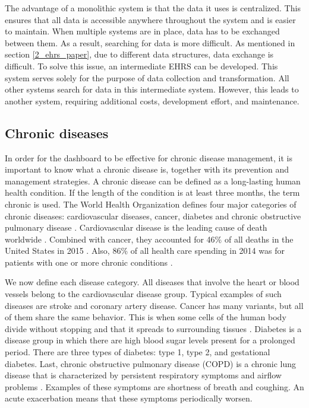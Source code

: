         The advantage of a monolithic system is that the data it uses is centralized. This ensures that all data is accessible anywhere throughout the system and is easier to maintain. When multiple systems are in place, data has to be exchanged between them. As a result, searching for data is more difficult. As mentioned in section \ref{2_ehrs_paper}, due to different data structures, data exchange is difficult. To solve this issue, an intermediate EHRS can be developed. This system serves solely for the purpose of data collection and transformation. All other systems search for data in this intermediate system. However, this leads to another system, requiring additional costs, development effort, and maintenance.
    
    \subsection{Chronic diseases} \label{chronic_diseases}

    In order for the dashboard to be effective for chronic disease management, it is important to know what a chronic disease is, together with its prevention and management strategies. A chronic disease can be defined as a long-lasting human health condition. If the length of the condition is at least three months, the term chronic is used. The World Health Organization defines four major categories of chronic diseases: cardiovascular diseases, cancer, diabetes and chronic obstructive pulmonary disease \cite{world2017noncommunicable}. Cardiovascular disease is the leading cause of death worldwide \cite{mendis2011global}. Combined with cancer, they accounted for 46\% of all deaths in the United States in 2015 \cite{national2016health}. Also, 86\% of all health care spending in 2014 was for patients with one or more chronic conditions \cite{gerteis2014multiple}.

    We now define each disease category. All diseases that involve the heart or blood vessels belong to the cardiovascular disease group. Typical examples of such diseases are stroke and coronary artery disease. Cancer has many variants, but all of them share the same behavior. This is when some cells of the human body divide without stopping and that it spreads to surrounding tissues \cite{cancer_def}. Diabetes is a disease group in which there are high blood sugar levels present for a prolonged period. There are three types of diabetes: type 1, type 2, and gestational diabetes. Last, chronic obstructive pulmonary disease (COPD) is a chronic lung disease that is characterized by persistent respiratory symptoms and airflow problems \cite{vogelmeier2017global}. Examples of these symptoms are shortness of breath and coughing. An acute exacerbation means that these symptoms periodically worsen.
    
